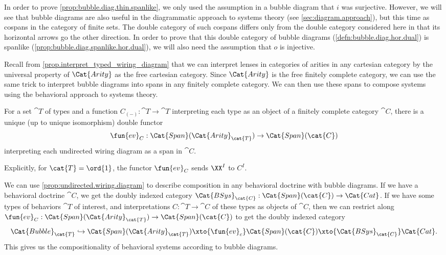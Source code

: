 \documentclass[DynamicalBook]{subfiles}
\begin{document}
In order to prove \cref{prop:bubble.diag.thin.spanlike}, we only used the assumption in a bubble diagram that $i$ was surjective. However, we will see that bubble diagrams are also useful in the diagrammatic approach to systems theory (see \cref{sec:diagram.approach}), but this time as cospans in the category of finite sets. The double category of such cospans differs only from the double category considered here in that its horizontal arrows go the other direction. In order to prove that this double category of bubble diagrams (\cref{defn:bubble.diag.hor.dual}) is spanlike (\cref{prop:bubble.diag.spanlike.hor.dual}), we will also need the assumption that $o$ is injective.

Recall from \cref{prop.interpret_typed_wiring_diagram} that we can interpret lenses in categories of arities in any cartesian category by the universal property of $\Cat{Arity}$ as the free cartesian category. Since $\Cat{Arity}$ is the free finitely complete category, we can use the same trick to interpret bubble diagrams into spans in any finitely complete category. We can then use these spans to compose systems using the behavioral approach to systems theory.

    \begin{proposition}\label{prop:undirected.wiring.diagram}
      For a set $\cat{T}$ of types and a function $C_{(-)} : \cat{T} \to \cat{T}$ interpreting each type as an object of a finitely complete category $\cat{C}$, there is a unique (up to unique isomorphism) double functor
      $$\fun{ev}_{C} : \Cat{Span}(\Cat{Arity}_{\cat{T}}) \to \Cat{Span}(\cat{C})$$
      interpreting each undirected wiring diagram as a span in $\cat{C}$.
      \end{proposition}

      Explicitly, for $\cat{T} = \ord{1}$, the functor $\fun{ev}_{C}$ sends $\XX^{I}$ to $C^{I}$.

      We can use \cref{prop:undirected.wiring.diagram} to describe composition in any behavioral doctrine with bubble diagrams. If we have a behavioral doctrine $\cat{C}$, we get the doubly indexed category $\Cat{BSys}_{\cat{C}} : \Cat{Span}(\cat{C}) \to \Cat{Cat}$. If we have some types of behaviors $\cat{T}$ of interest, and interpretations $C : \cat{T} \to \cat{C}$ of these types as objects of $\cat{C}$, then we can restrict along $\fun{ev}_{C} : \Cat{Span}(\Cat{Arity}_{\cat{T}}) \to \Cat{Span}(\cat{C})$ to get the doubly indexed category
      \[
\Cat{Bubble}_{\cat{T}} \hookrightarrow \Cat{Span}(\Cat{Arity}_{\cat{T}}) \xto{\fun{ev}_{c}} \Cat{Span}(\cat{C}) \xto{\Cat{BSys}_{\cat{C}}} \Cat{Cat}.
      \]
      This gives us the compositionality of behavioral systems according to bubble diagrams.
\end{document}
